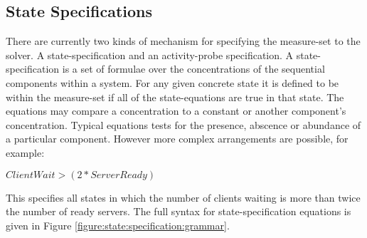 \documentclass[times, 10pt,twocolumn]{article}
\begin{document}
\subsection{State Specifications}
There are currently two kinds of mechanism for specifying the measure-set to
the solver. A state-specification and an activity-probe specification.
A state-specification is a set of formulae over the concentrations of the
sequential components within a system. For any given concrete state it is
defined to be within the measure-set if all of the state-equations are true
in that state. The equations may compare a concentration to a constant
or another component's concentration.
Typical equations tests for the presence, abscence or abundance of a particular
component. However more complex arrangements are possible, for example:

$ClientWait > (2 * ServerReady)$

\noindent
This specifies all states in which the number of clients waiting is more than
twice the number of ready servers.
The full syntax for state-specification equations is given in
Figure \ref{figure:state:specification:grammar}.

\newcommand{\grammartopline}[3]{
$#1$ & $:=$ & $#2$ & #3
}

\newcommand{\splitgrammartopline}[4]{
\grammartopline{#1}{#2}{}\\
\grammarline{#3}{#4}
}

\newcommand{\grammarline}[2]{
& $\mid$ & $#1$ & #2
}

\newcommand{\splitgrammarline}[3]{
& $\mid$ & $#1$ & \\
&        & $#2$ & #3
}

\newcommand{\doublesplitgrammarline}[4]{
& $\mid$ & $#1$ & \\
&        & $#2$ & \\
&        & $#3$ & #4
}
\end{document}
